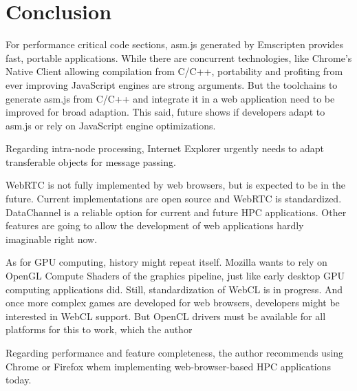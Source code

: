 \section{Conclusion} \label{chapter_conclusion}

For performance critical code sections, asm.js generated by Emscripten provides fast, portable applications. While there are concurrent technologies, like Chrome's Native Client allowing compilation from C/C++, portability and profiting from ever improving JavaScript engines are strong arguments. But the toolchains to generate asm.js from C/C++ and integrate it in a web application need to be improved for broad adaption. This said, future shows if developers adapt to asm.js or rely on JavaScript engine optimizations.

Regarding intra-node processing, Internet Explorer urgently needs to adapt transferable objects for message passing.

WebRTC is not fully implemented by web browsers, but is expected to be in the future. Current implementations are open source and WebRTC is standardized. DataChannel is a reliable option for current and future HPC applications. Other features are going to allow the development of web applications hardly imaginable right now.

As for GPU computing, history might repeat itself. Mozilla wants to rely on OpenGL Compute Shaders of the graphics pipeline, just like early desktop GPU computing applications did. Still, standardization of WebCL is in progress. And once more complex games are developed for web browsers, developers might be interested in WebCL support. But OpenCL drivers must be available for all platforms for this to work, which the author 

Regarding performance and feature completeness, the author recommends using Chrome or Firefox whem implementing web-browser-based HPC applications today.
